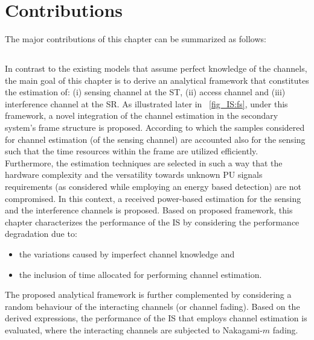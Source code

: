 \section{Contributions}
The major contributions of this chapter can be summarized as follows:
\subsection{}
In contrast to the existing models that assume perfect knowledge of the channels, the main goal of this chapter is to derive an analytical framework that constitutes the estimation of: (i) sensing channel at the ST, (ii) access channel and (iii) interference channel at the SR. As illustrated later in \figurename~\ref{fig_IS:fs}, under this framework, a novel integration of the channel estimation in the secondary system's frame structure is proposed. According to which the samples considered for channel estimation (of the sensing channel) are accounted also for the sensing such that the time resources within the frame are utilized efficiently. Furthermore, the estimation techniques are selected in such a way that the hardware complexity and the versatility towards unknown PU signals requirements (as considered while employing an energy based detection) are not compromised. In this context, a received power-based estimation for the sensing and the interference channels is proposed. Based on proposed framework, this chapter characterizes the performance of the IS by considering the performance degradation due to: \begin{itemize} \item the variations caused by imperfect channel knowledge and \item the inclusion of time allocated for performing channel estimation. \end{itemize} 
The proposed analytical framework is further complemented by considering a random behaviour of the interacting channels (or channel fading). Based on the derived expressions, the performance of the IS that employs channel estimation is evaluated, where the interacting channels are subjected to Nakagami-$m$ fading.


